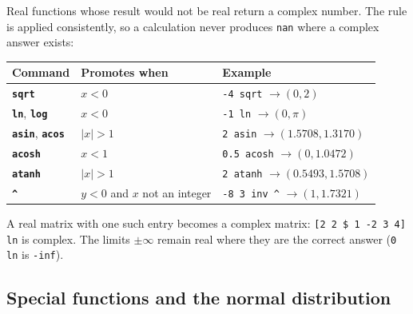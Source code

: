\documentclass[11pt,letterpaper]{article}
\newcommand{\code}[1]{\texttt{#1}}
\newcommand{\cmd}[1]{\texttt{\textbf{#1}}}
\begin{document}
Real functions whose result would not be real return a complex number. The rule is applied consistently, so a calculation never produces \code{nan} where a complex answer exists:

\begin{center}
\begin{tabular}{@{}lll@{}}
\toprule
Command & Promotes when & Example \\
\midrule
\cmd{sqrt}  & $x < 0$   & \code{-4 sqrt} $\to (0, 2)$ \\
\cmd{ln}, \cmd{log} & $x < 0$ & \code{-1 ln} $\to (0, \pi)$ \\
\cmd{asin}, \cmd{acos} & $|x| > 1$ & \code{2 asin} $\to (1.5708, 1.3170)$ \\
\cmd{acosh} & $x < 1$   & \code{0.5 acosh} $\to (0, 1.0472)$ \\
\cmd{atanh} & $|x| > 1$ & \code{2 atanh} $\to (0.5493, 1.5708)$ \\
\cmd{\textasciicircum} & $y < 0$ and $x$ not an integer & \code{-8 3 inv \textasciicircum} $\to (1, 1.7321)$ \\
\bottomrule
\end{tabular}
\end{center}

A real matrix with one such entry becomes a complex matrix: \code{[2 2 \$ 1 -2 3 4] ln} is complex. The limits $\pm\infty$ remain real where they are the correct answer (\code{0 ln} is \code{-inf}).

\subsection{Special functions and the normal distribution}
\end{document}
